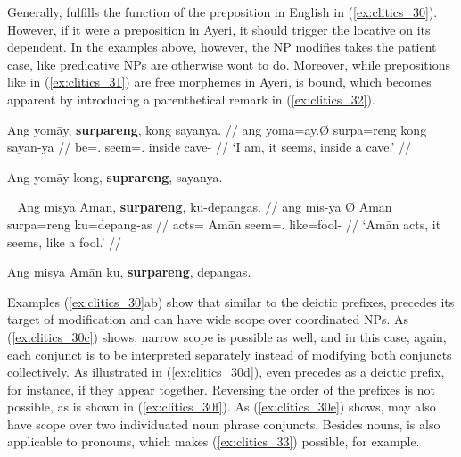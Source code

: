 Generally,  fulfills the function of the preposition 
in English in (\ref{ex:clitics_30}). However, if it were a preposition in
Ayeri, it should trigger the locative on its dependent. In the examples above,
however, the NP  modifies takes the patient case, like
predicative NPs are otherwise wont to do. Moreover, while prepositions like
 in (\ref{ex:clitics_31}) are free morphemes in Ayeri,
 is bound, which becomes apparent by introducing a parenthetical
remark in (\ref{ex:clitics_32}).

\pex\label{ex:clitics_31}
\a\label{ex:clitics_31a}\begingl
	\gla Ang yomāy, \textbf{surpareng}, kong sayanya. //
	\glb ang yoma=ay.Ø surpa=reng kong sayan-ya //
	\glc \AgtT{} be=\Fsg{}.\Top{} seem=\TsgI{}.\Aarg{} inside cave-\Loc{} //
	\glft `I am, it seems, inside a cave.' //
\endgl


\a\label{ex:clitics_31b}
	Ang yomāy kong, \textbf{suprareng}, sayanya.
\xe

\pex~\label{ex:clitics_32}
\a\label{ex:clitics_32a}\begingl
	\gla Ang misya {} Amān, \textbf{surpareng}, ku-depangas. //
	\glb ang mis-ya Ø Amān surpa=reng ku=depang-as //
	\glc \AgtT{} acts=\TsgM{} \Top{} Amān seem=\TsgI{}.\Aarg{} 
		like=fool-\Parg{} //
	\glft `Amān acts, it seems, like a fool.' //
\endgl


\a\label{ex:clitics_32b}\ljudge{*}
	Ang misya Amān ku, \textbf{surpareng}, depangas.
\xe

Examples (\ref{ex:clitics_30}ab) show that similar to the deictic prefixes,
 precedes its target of modification and can have wide scope
over coordinated NPs. As (\ref{ex:clitics_30c}) shows, narrow scope is possible
as well, and in this case, again, each conjunct is to be interpreted separately
instead of  modifying both conjuncts collectively. As
illustrated in (\ref{ex:clitics_30d}),  even precedes
 as a deictic prefix, for instance, if they appear together.
Reversing the order of the prefixes is not possible, as is shown in
(\ref{ex:clitics_30f}). As (\ref{ex:clitics_30e}) shows,  may
also have scope over two individuated noun phrase conjuncts. Besides nouns,
 is also applicable to pronouns, which makes
(\ref{ex:clitics_33}) possible, for example.

